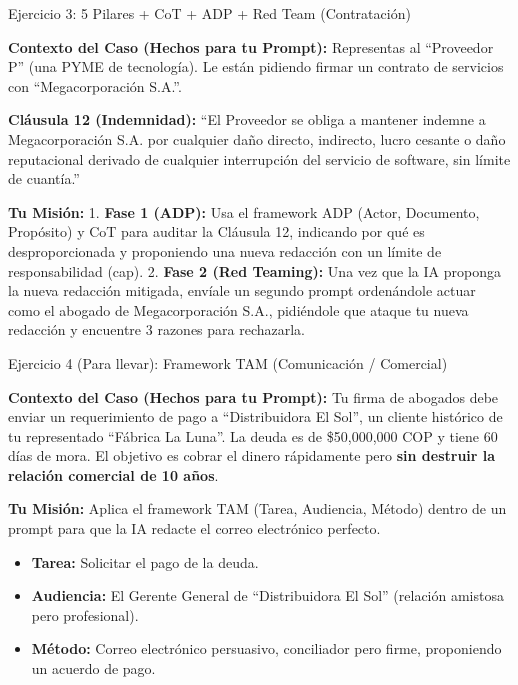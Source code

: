 \documentclass[aspectratio=169]{beamer}
\begin{document}
\begin{frame}[fragile]{Ejercicio 3: 5 Pilares + CoT + ADP + Red Team (Contratación)}


\textbf{Contexto del Caso (Hechos para tu Prompt):}
Representas al ``Proveedor P'' (una PYME de tecnología). Le están pidiendo firmar un contrato de servicios con ``Megacorporación S.A.''.

\textbf{Cláusula 12 (Indemnidad):} ``El Proveedor se obliga a mantener indemne a Megacorporación S.A. por cualquier daño directo, indirecto, lucro cesante o daño reputacional derivado de cualquier interrupción del servicio de software, sin límite de cuantía.''

\textbf{Tu Misión:}
1. \textbf{Fase 1 (ADP):} Usa el framework ADP (Actor, Documento, Propósito) y CoT para auditar la Cláusula 12, indicando por qué es desproporcionada y proponiendo una nueva redacción con un límite de responsabilidad (cap).
2. \textbf{Fase 2 (Red Teaming):} Una vez que la IA proponga la nueva redacción mitigada, envíale un segundo prompt ordenándole actuar como el abogado de Megacorporación S.A., pidiéndole que ataque tu nueva redacción y encuentre 3 razones para rechazarla.

\end{frame}



\begin{frame}[fragile]{Ejercicio 4 (Para llevar): Framework TAM (Comunicación / Comercial)}


\textbf{Contexto del Caso (Hechos para tu Prompt):}
Tu firma de abogados debe enviar un requerimiento de pago a ``Distribuidora El Sol'', un cliente histórico de tu representado ``Fábrica La Luna''. La deuda es de \$50,000,000 COP y tiene 60 días de mora. El objetivo es cobrar el dinero rápidamente pero \textbf{sin destruir la relación comercial de 10 años}.

\textbf{Tu Misión:}
Aplica el framework TAM (Tarea, Audiencia, Método) dentro de un prompt para que la IA redacte el correo electrónico perfecto.
\begin{itemize}
  \item \textbf{Tarea:} Solicitar el pago de la deuda.
  \item \textbf{Audiencia:} El Gerente General de ``Distribuidora El Sol'' (relación amistosa pero profesional).
  \item \textbf{Método:} Correo electrónico persuasivo, conciliador pero firme, proponiendo un acuerdo de pago.
\end{itemize}
\end{frame}
\end{document}
